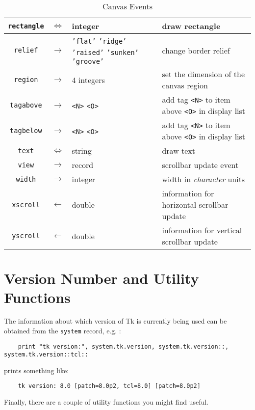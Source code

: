\begin{table}[tbh]
{\begin{center}
\begin{tabular}{|c|c|p{0.6in}|p{3.3in}|}
{\tt rectangle}	&$\Leftrightarrow$&integer& draw rectangle \\ \hline
{\tt relief}	&$\rightarrow$& {\tt 'flat'} {\tt 'ridge'} {\tt 'raised'} {\tt 'sunken'} {\tt 'groove'} & change border relief \\ \hline
{\tt region}	&$\rightarrow$&4 integers& set the dimension of the canvas region \\ \hline
{\tt tagabove}	&$\rightarrow$&\verb+<N>+ \verb+<O>+& add tag \verb+<N>+ to item above \verb+<O>+ in display list \\ \hline
{\tt tagbelow}	&$\rightarrow$&\verb+<N>+ \verb+<O>+& add tag \verb+<N>+ to item above \verb+<O>+ in display list \\ \hline
{\tt text}	&$\Leftrightarrow$&string& draw text \\ \hline
{\tt view}	&$\rightarrow$&record& scrollbar update event \\ \hline
{\tt width}	&$\rightarrow$&integer& width in {\em character} units \\ \hline
{\tt xscroll}	&$\leftarrow$&double& information for horizontal scrollbar update \\ \hline
{\tt yscroll}	&$\leftarrow$&double& information for vertical scrollbar update \\ \hline
\end{tabular}
\end{center}
}
\caption{ Canvas Events }
\label{tkcanvas-events}
\end{table}

\section{Version Number and Utility Functions}

\label{system-tk}
The information about which version of Tk is currently being used can be
obtained from the {\tt system} record, e.g. :
\begin{verbatim}
    print "tk version:", system.tk.version, system.tk.version::, system.tk.version::tcl::
\end{verbatim}
prints something like:
\begin{verbatim}
    tk version: 8.0 [patch=8.0p2, tcl=8.0] [patch=8.0p2]
\end{verbatim}

Finally, there are a couple of utility functions you might find useful.

